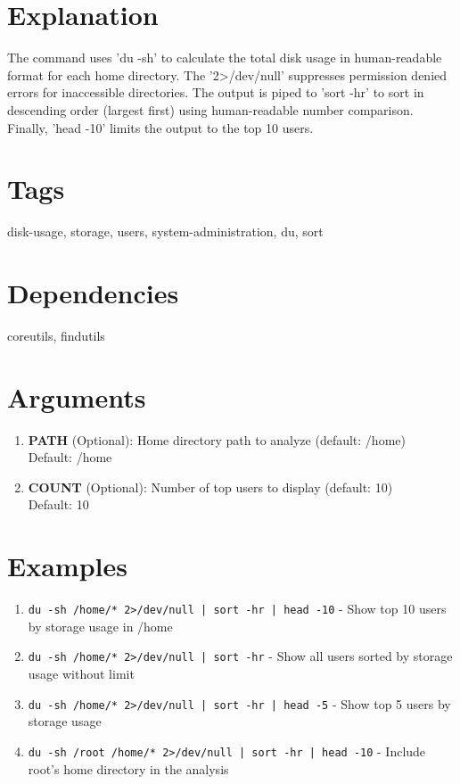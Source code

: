 \documentclass[openany]{book}
\begin{document}
\section*{Explanation}
The command uses 'du -sh' to calculate the total disk usage in human-readable format for each home directory. The '2>/dev/null' suppresses permission denied errors for inaccessible directories. The output is piped to 'sort -hr' to sort in descending order (largest first) using human-readable number comparison. Finally, 'head -10' limits the output to the top 10 users.

\section*{Tags}
disk-usage, storage, users, system-administration, du, sort

\section*{Dependencies}
coreutils, findutils


\section*{Arguments}
\begin{enumerate}
  \item \textbf{PATH} (Optional): Home directory path to analyze (default: /home) \\ Default: /home
  \item \textbf{COUNT} (Optional): Number of top users to display (default: 10) \\ Default: 10
\end{enumerate}

\section*{Examples}
\begin{enumerate}
  \item \texttt{du -sh /home/* 2>/dev/null | sort -hr | head -10} - Show top 10 users by storage usage in /home
  \item \texttt{du -sh /home/* 2>/dev/null | sort -hr} - Show all users sorted by storage usage without limit
  \item \texttt{du -sh /home/* 2>/dev/null | sort -hr | head -5} - Show top 5 users by storage usage
  \item \texttt{du -sh /root /home/* 2>/dev/null | sort -hr | head -10} - Include root's home directory in the analysis
\end{enumerate}
\end{document}
